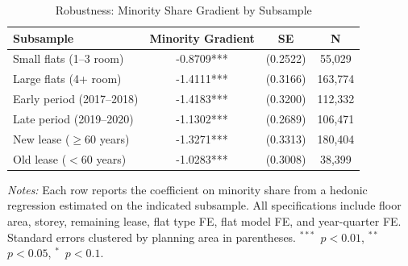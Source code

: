 \begin{table}[t]
\centering
\caption{Robustness: Minority Share Gradient by Subsample}
\label{tab:robustness}
\begin{tabular}{lccc}
\hline\hline
Subsample & Minority Gradient & SE & N \\
\hline
Small flats (1--3 room) & -0.8709*** & (0.2522) & 55,029 \\
Large flats (4+ room) & -1.4111*** & (0.3166) & 163,774 \\
Early period (2017--2018) & -1.4183*** & (0.3200) & 112,332 \\
Late period (2019--2020) & -1.1302*** & (0.2689) & 106,471 \\
New lease ($\geq$60 years) & -1.3271*** & (0.3313) & 180,404 \\
Old lease ($<$60 years) & -1.0283*** & (0.3008) & 38,399 \\
\hline\hline
\end{tabular}
\begin{tablenotes}[flushleft]\small
\item \textit{Notes:} Each row reports the coefficient on minority share from a hedonic regression estimated on the indicated subsample. All specifications include floor area, storey, remaining lease, flat type FE, flat model FE, and year-quarter FE. Standard errors clustered by planning area in parentheses. $^{***}$~$p<0.01$, $^{**}$~$p<0.05$, $^{*}$~$p<0.1$.
\end{tablenotes}
\end{table}

